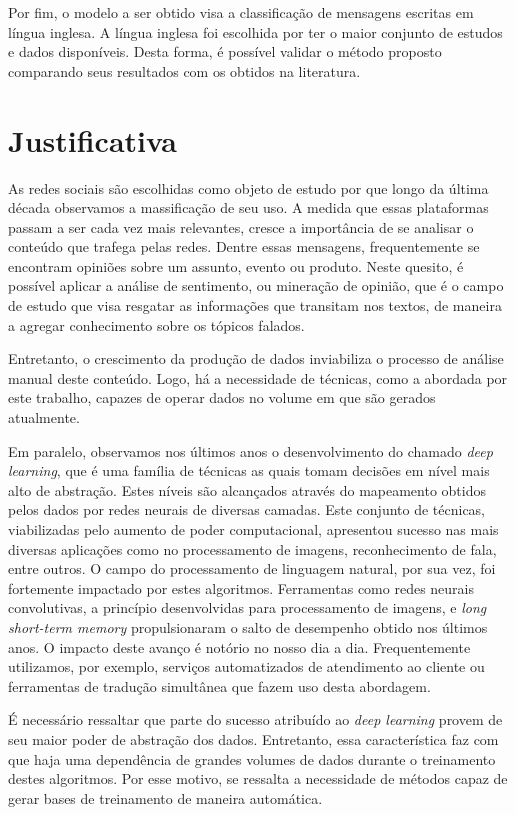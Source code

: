 Por fim, o modelo a ser obtido visa a classificação de mensagens escritas em língua inglesa.
A língua inglesa foi escolhida por ter o maior conjunto de estudos e dados disponíveis.
Desta forma, é possível validar o método proposto comparando seus resultados com os obtidos na literatura.

\section{Justificativa}

As redes sociais são escolhidas como objeto de estudo por que longo da última década observamos a massificação de seu
uso.
A medida que essas plataformas passam a ser cada vez mais relevantes, cresce a importância de se analisar o conteúdo
que trafega pelas redes.
Dentre essas mensagens, frequentemente se encontram opiniões sobre um assunto, evento ou produto.
Neste quesito, é possível aplicar a análise de sentimento, ou mineração de opinião, que é o campo de estudo que visa
resgatar as informações que transitam nos textos, de maneira a agregar conhecimento sobre os tópicos falados.

Entretanto, o crescimento da produção de dados inviabiliza o processo de análise manual deste conteúdo.
Logo, há a necessidade de técnicas, como a abordada por este trabalho, capazes de operar dados no volume em que são
gerados atualmente.

Em paralelo, observamos nos últimos anos o desenvolvimento do chamado \textit{deep learning}, que é uma família de
técnicas as quais tomam decisões em nível mais alto de abstração.
Estes níveis são alcançados através do mapeamento obtidos pelos dados por redes neurais de diversas camadas.
Este conjunto de técnicas, viabilizadas pelo aumento de poder computacional, apresentou sucesso nas mais diversas
aplicações como no processamento de imagens, reconhecimento de fala, entre outros.
O campo do processamento de linguagem natural, por sua vez, foi fortemente impactado por estes algoritmos.
Ferramentas como redes neurais convolutivas, a princípio desenvolvidas para processamento de imagens, e
\textit{long short-term memory} propulsionaram o salto de desempenho obtido nos últimos anos.
O impacto deste avanço é notório no nosso dia a dia.
Frequentemente utilizamos, por exemplo, serviços automatizados de atendimento ao cliente ou ferramentas de tradução
simultânea que fazem uso desta abordagem.

É necessário ressaltar que parte do sucesso atribuído ao \textit{deep learning} provem de seu maior poder de abstração
dos dados.
Entretanto, essa característica faz com que haja uma dependência de grandes volumes de dados durante o treinamento
destes algoritmos.
Por esse motivo, se ressalta a necessidade de métodos capaz de gerar bases de treinamento de maneira automática.

